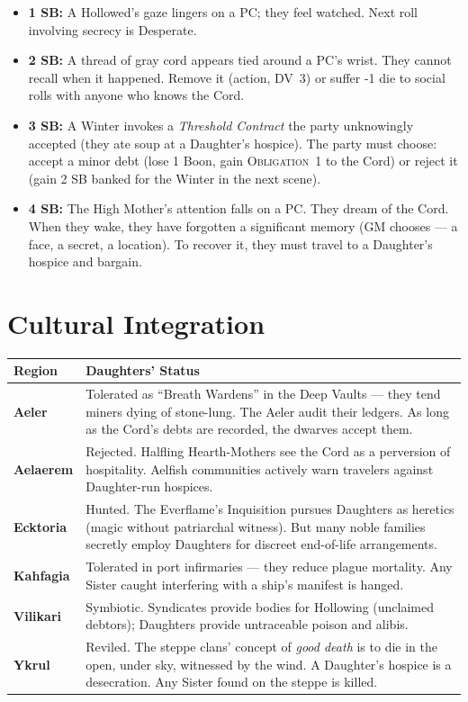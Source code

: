 \documentclass[10pt,twoside]{book}
\newcommand{\dv}[1]{\textsc{DV}~#1}
\newcommand{\obligation}[1]{\textsc{Obligation}~#1}
\begin{document}
\begin{itemize}
\item \textbf{1 SB:} A Hollowed's gaze lingers on a PC; they feel watched. Next roll involving secrecy is Desperate.
\item \textbf{2 SB:} A thread of gray cord appears tied around a PC's wrist. They cannot recall when it happened. Remove it (action, \dv{3}) or suffer -1 die to social rolls with anyone who knows the Cord.
\item \textbf{3 SB:} A Winter invokes a \textit{Threshold Contract} the party unknowingly accepted (they ate soup at a Daughter's hospice). The party must choose: accept a minor debt (lose 1 Boon, gain \obligation{1} to the Cord) or reject it (gain 2 SB banked for the Winter in the next scene).
\item \textbf{4 SB:} The High Mother's attention falls on a PC. They dream of the Cord. When they wake, they have forgotten a significant memory (GM chooses --- a face, a secret, a location). To recover it, they must travel to a Daughter's hospice and bargain.
\end{itemize}

\section{Cultural Integration}

\begin{tabular}{@{}p{}p{}@{}}
\toprule
\textbf{Region} & \textbf{Daughters' Status} \\
\midrule
\textbf{Aeler} & Tolerated as ``Breath Wardens'' in the Deep Vaults --- they tend miners dying of stone-lung. The Aeler audit their ledgers. As long as the Cord's debts are recorded, the dwarves accept them. \\
\textbf{Aelaerem} & Rejected. Halfling Hearth-Mothers see the Cord as a perversion of hospitality. Aelfish communities actively warn travelers against Daughter-run hospices. \\
\textbf{Ecktoria} & Hunted. The Everflame's Inquisition pursues Daughters as heretics (magic without patriarchal witness). But many noble families secretly employ Daughters for discreet end-of-life arrangements. \\
\textbf{Kahfagia} & Tolerated in port infirmaries --- they reduce plague mortality. Any Sister caught interfering with a ship's manifest is hanged. \\
\textbf{Vilikari} & Symbiotic. Syndicates provide bodies for Hollowing (unclaimed debtors); Daughters provide untraceable poison and alibis. \\
\textbf{Ykrul} & Reviled. The steppe clans' concept of \textit{good death} is to die in the open, under sky, witnessed by the wind. A Daughter's hospice is a desecration. Any Sister found on the steppe is killed. \\
\bottomrule
\end{tabular}
\end{document}
